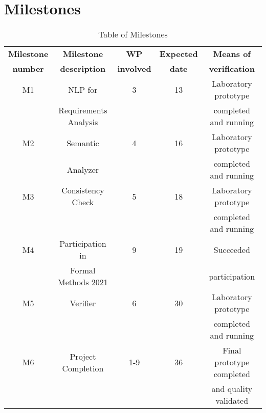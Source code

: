 \section{Milestones}

\begin{table}[hbpt]\centering
	\begin{adjustbox}{width=1\textwidth}
		\begin{tabular}{ |c|c|c|c|c|} 
			\hline
			\textbf{Milestone} & \textbf{Milestone} & \textbf{WP} & \textbf{Expected} & \textbf{Means of}\\
			\textbf{number} & \textbf{description} & \textbf{involved} & \textbf{date} & \textbf{verification} \\
			\hline
			
			M1 & \gls{NLP} for & 3 & 13 & Laboratory prototype\\
			~ & Requirements Analysis & ~ & ~ & completed and running\\
			\hline
			
			M2 & Semantic & 4 & 16 & Laboratory prototype\\
			~ & Analyzer & ~ & ~ & completed and running\\
			\hline
			
			M3 & Consistency Check & 5 & 18 & Laboratory prototype\\
			~ & ~ & ~ & ~ & completed and running \\
			\hline
			
			M4 & Participation in & 9 & 19 & Succeeded\\
			~ & Formal Methods 2021 & ~ & ~ & participation \\
			\hline
			
			M5 & Verifier & 6 & 30 & Laboratory prototype\\
			~ & ~ & ~ & ~ & completed and running \\
			\hline
			
			M6 & Project Completion & 1-9 & 36 & Final prototype completed\\
			~ & ~ & ~ & ~ & and quality validated \\
			\hline
			
		\end{tabular}
	\end{adjustbox}
\caption{Table of Milestones}
\end{table}